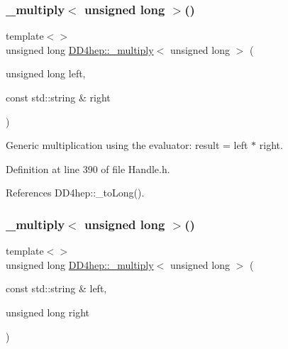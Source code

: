\subsubsection{\texorpdfstring{\+\_\+multiply$<$ unsigned long $>$()}{\_multiply< unsigned long >()}\hspace{0.1cm}{\footnotesize\ttfamily [2/3]}}
{\footnotesize\ttfamily template$<$$>$ \\
unsigned long \hyperlink{group___d_d4_h_e_p___g_e_o_m_e_t_r_y_gab860c2299e2eb50e537c5079fb0c9c51}{D\+D4hep\+::\+\_\+multiply}$<$ unsigned long $>$ (\begin{DoxyParamCaption}\item[{unsigned long}]{left,  }\item[{const std\+::string \&}]{right }\end{DoxyParamCaption})\hspace{0.3cm}{\ttfamily [inline]}}



Generic multiplication using the evaluator\+: result = left $\ast$ right. 



Definition at line 390 of file Handle.\+h.



References D\+D4hep\+::\+\_\+to\+Long().

\hypertarget{group___d_d4_h_e_p___g_e_o_m_e_t_r_y_ga97440d35af9ad225e4307321a7735e59}{}\label{group___d_d4_h_e_p___g_e_o_m_e_t_r_y_ga97440d35af9ad225e4307321a7735e59} 
\subsubsection{\texorpdfstring{\+\_\+multiply$<$ unsigned long $>$()}{\_multiply< unsigned long >()}\hspace{0.1cm}{\footnotesize\ttfamily [3/3]}}
{\footnotesize\ttfamily template$<$$>$ \\
unsigned long \hyperlink{group___d_d4_h_e_p___g_e_o_m_e_t_r_y_gab860c2299e2eb50e537c5079fb0c9c51}{D\+D4hep\+::\+\_\+multiply}$<$ unsigned long $>$ (\begin{DoxyParamCaption}\item[{const std\+::string \&}]{left,  }\item[{unsigned long}]{right }\end{DoxyParamCaption})\hspace{0.3cm}{\ttfamily [inline]}}



